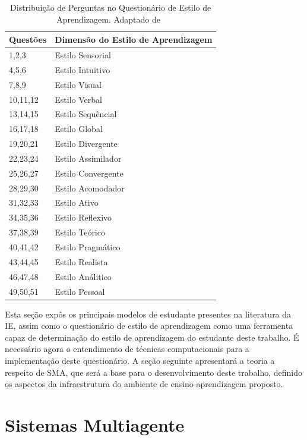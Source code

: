 \begin{table}
	\caption{Distribuição de Perguntas no Questionário de Estilo de Aprendizagem. Adaptado de~\cite{muhlbeier12}}
	\centering
	\begin{tabular}{|p{4cm} | p{8cm} |}
		\hline
		\textbf{Questões}	& \textbf{Dimensão do Estilo de Aprendizagem}	\\
		\hline
		1,2,3	&  Estilo Sensorial	\\
		\hline
		4,5,6	&  Estilo Intuitivo	\\
		\hline
		7,8,9	&  Estilo Visual	\\
		\hline
		10,11,12	&  Estilo Verbal	\\
		\hline
		13,14,15	&  Estilo Sequêncial	\\
		\hline
		16,17,18	&  Estilo Global	\\
		\hline
		19,20,21	&  Estilo Divergente	\\
		\hline
		22,23,24	&  Estilo Assimilador	\\
		\hline
		25,26,27	&  Estilo Convergente	\\
		\hline
		28,29,30	&  Estilo Acomodador	\\
		\hline
		31,32,33	&  Estilo Ativo	\\
		\hline
		34,35,36	&  Estilo Reflexivo	\\
		\hline
		37,38,39	&  Estilo Teórico	\\
		\hline
		40,41,42	&  Estilo Pragmático	\\
		\hline
		43,44,45	&  Estilo Realista	\\
		\hline
		46,47,48	&  Estilo Análitico	\\
		\hline
		49,50,51	&  Estilo Pessoal	\\
		\hline
	\end{tabular}
	\label{questionario_ie}
\end{table}

Esta seção expôs os principais modelos de estudante presentes na literatura da IE, assim como o questionário de estilo de aprendizagem como uma ferramenta capaz de determinação do estilo de aprendizagem do estudante deste trabalho. É necessário agora o entendimento de técnicas computacionais para a implementação deste questionário. A seção seguinte apresentará a teoria a respeito de SMA, que será a base para o desenvolvimento deste trabalho, definido os aspectos da infraestrutura do ambiente de ensino-aprendizagem proposto.

\section{Sistemas Multiagente}\label{section:sma}

